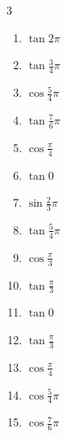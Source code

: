 \begin{multicols}{3}
\begin{enumerate}
  \item $\displaystyle \tan{2\pi}$
        \phantom{$\displaystyle =0$}

  \item $\displaystyle \tan{\frac{3}{4}\pi}$
        \phantom{$\displaystyle =-1$}

  \item $\displaystyle \cos{\frac{5}{4}\pi}$

  \item $\displaystyle \tan{\frac{7}{6}\pi}$

  \item $\displaystyle \cos{\frac{\pi}{4}}$

  \item $\displaystyle \tan{0}$
        \phantom{$\displaystyle =0$}

  \item $\displaystyle \sin{\frac{2}{3}\pi}$

  \item $\displaystyle \tan{\frac{5}{4}\pi}$
        \phantom{$\displaystyle =1$}

  \item $\displaystyle \cos{\frac{\pi}{3}}$

  \item $\displaystyle \tan{\frac{\pi}{3}}$

  \item $\displaystyle \tan{0}$
        \phantom{$\displaystyle =0$}

\columnbreak %

  \item $\displaystyle \tan{\frac{\pi}{3}}$

  \item $\displaystyle \cos{\frac{\pi}{4}}$

  \item $\displaystyle \cos{\frac{5}{4}\pi}$

  \item $\displaystyle \cos{\frac{7}{6}\pi}$


\end{enumerate}
\end{multicols}
